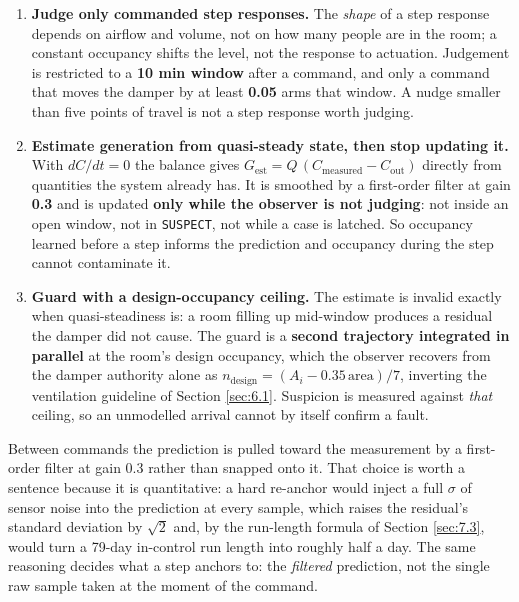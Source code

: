 \begin{enumerate}
\tightlist
\item \textbf{Judge only commanded step responses.} The \emph{shape} of a step response depends on
  airflow and volume, not on how many people are in the room; a constant occupancy shifts the
  level, not the response to actuation. Judgement is restricted to a \textbf{10 min window} after a
  command, and only a command that moves the damper by at least \textbf{0.05} arms that window. A
  nudge smaller than five points of travel is not a step response worth judging.
\item \textbf{Estimate generation from quasi-steady state, then stop updating it.} With
  $dC/dt = 0$ the balance gives $G_\text{est} = Q\,(C_\text{measured} - C_\text{out})$ directly
  from quantities the system already has. It is smoothed by a first-order filter at gain
  \textbf{0.3} and is updated \textbf{only while the observer is not judging}: not inside an open
  window, not in \texttt{SUSPECT}, not while a case is latched. So occupancy learned before a step
  informs the prediction and occupancy during the step cannot contaminate it.
\item \textbf{Guard with a design-occupancy ceiling.} The estimate is invalid exactly when
  quasi-steadiness is: a room filling up mid-window produces a residual the damper did not cause.
  The guard is a \textbf{second trajectory integrated in parallel} at the room's design occupancy,
  which the observer recovers from the damper authority alone as
  $n_\text{design} = (A_i - 0.35\,\text{area})/7$, inverting the ventilation guideline of Section
  \ref{sec:6.1}. Suspicion is measured against \emph{that} ceiling, so an unmodelled arrival cannot by itself
  confirm a fault.
\end{enumerate}

Between commands the prediction is pulled toward the measurement by a first-order filter at gain
0.3 rather than snapped onto it. That choice is worth a sentence because it is quantitative: a hard
re-anchor would inject a full $\sigma$ of sensor noise into the prediction at every sample, which
raises the residual's standard deviation by $\sqrt{2}$ and, by the run-length formula of Section
\ref{sec:7.3}, would turn a 79-day in-control run length into roughly half a day. The same reasoning decides
what a step anchors to: the \emph{filtered} prediction, not the single raw sample taken at the
moment of the command.

